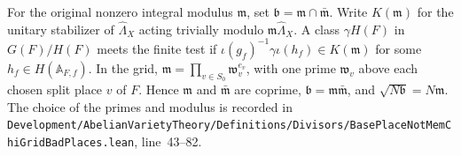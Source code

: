 \documentclass[a4paper,11pt]{article}
\theoremstyle{definition}
\theoremstyle{remark}
\newcommand{\srcloc}[2]{{\small\nolinkurl{#1.lean}}, line~#2}
\numberwithin{equation}{section}
\begin{document}
For the original nonzero integral modulus \(\mathfrak m\), set
\(\mathfrak b=\mathfrak m\cap\bar{\mathfrak m}\). Write \(K(\mathfrak m)\)
for the unitary stabilizer of \(\widehat\Lambda_X\) acting trivially
modulo \(\mathfrak m\widehat\Lambda_X\). A class \(\gamma H(F)\)
in \(G(F)/H(F)\) meets the finite test if
\(\iota(g_f)^{-1}\gamma\iota(h_f)\in K(\mathfrak m)\) for some
\(h_f\in H(\mathbb A_{F,f})\).
In the grid, \(\mathfrak m=\prod_{v\in S_0}\mathfrak w_v^{e_v}\),
with one prime \(\mathfrak w_v\) above each chosen split place
\(v\) of \(F\). Hence \(\mathfrak m\) and \(\bar{\mathfrak m}\)
are coprime, \(\mathfrak b=\mathfrak m\bar{\mathfrak m}\), and
\(\sqrt{N\mathfrak b}=N\mathfrak m\). The choice of the primes
and modulus is recorded in
\srcloc{Development/AbelianVarietyTheory/Definitions/Divisors/BasePlaceNotMemChiGridBadPlaces}{43--82}.
\end{document}
